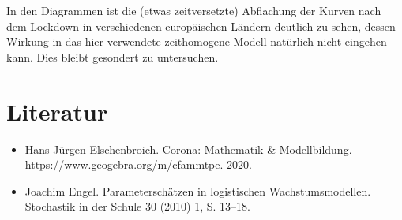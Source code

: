 \documentclass[a4paper,11pt]{article}
\begin{document}
In den Diagrammen ist die (etwas zeitversetzte) Abflachung der Kurven nach dem
Lockdown in verschiedenen europäischen Ländern deutlich zu sehen, dessen
Wirkung in das hier verwendete zeithomogene Modell natürlich nicht eingehen
kann.  Dies bleibt gesondert zu untersuchen. 

\section{Literatur}

\begin{itemize}
\item Hans-Jürgen Elschenbroich. Corona: Mathematik \& Modellbildung.\\
  \url{https://www.geogebra.org/m/cfammtpe}.  2020.
\item Joachim Engel. Parameterschätzen in logistischen Wachstumsmodellen.
  Stochastik in der Schule 30 (2010) 1, S. 13–18.
\end{itemize}
\end{document}
